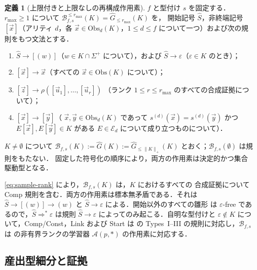 \documentclass[11pt,a4paper]{ltjsarticle}
\numberwithin{equation}{section}
\theoremstyle{plain}
\theoremstyle{definition}
\newtheorem{definition}[theorem]{定義}
\theoremstyle{remark}
\newcommand{\tuple}[1]{\vec{#1}}
\newcommand{\eps}{\varepsilon}
\theoremstyle{plain}
\begin{document}
\begin{definition}[上限付きと上限なしの再構成作用素]
\label{def:reconstruction}
$f$ と型付け $s$ を固定する．$r_{\max}\ge1$ について
$\mathcal B_{f,s}^{\le r_{\max}}(K)=\widehat G_{\le r_{\max}}(K)$ を，
開始記号 $\widehat S$，非終端記号 $[\tuple x]$（アリティ
$d$，各 $\tuple x\in\mathrm{Obs}_d(K)$，$1\le d\le f$ について一つ）および次の規則をもつ文法とする．
\begin{enumerate}[leftmargin=*]
\item[\textnormal{(Start)}] $\widehat S\to[(w)]$（$w\in K\cap\Sigma^+$ について），および
      $\widehat S\to\eps$（$\eps\in K$ のとき）；
\item[\textnormal{(Const)}] $[\tuple x]\to\tuple x$（すべての
      $\tuple x\in\mathrm{Obs}(K)$ について）；
\item[\textnormal{(Comp)}] $[\tuple z]\to\rho([\tuple u_1],\ldots,[\tuple u_r])$
      （ランク $1\le r\le r_{\max}$ のすべての合成証拠について）；
\item[\textnormal{(Link)}] $[\tuple x]\to[\tuple y]$（
      $\tuple x,\tuple y\in\mathrm{Obs}_d(K)$ であって
      $s^{(d)}(\tuple x)=s^{(d)}(\tuple y)$ かつ $E[\tuple x],E[\tuple y]\in K$
      がある $E\in\mathcal E_d$ について成り立つものについて）．
\end{enumerate}
$K\ne\emptyset$ について $\mathcal B_{f,s}(K):=\widehat G(K):=
\widehat G_{\le\|K\|_+}(K)$ とおく；$\mathcal B_{f,s}(\emptyset)$ は規則をもたない．
固定した符号化の順序により，両方の作用素は決定的かつ集合駆動型となる．
\end{definition}

\eqref{eq:sample-rank} により，$\mathcal B_{f,s}(K)$ は，$K$ におけるすべての
合成証拠について Comp 規則を含む．両方の作用素は標本無矛盾である．それは
$\widehat S\to[(w)]\to(w)$ と $\widehat S\to\eps$ による．開始以外のすべての雛形
は $\eps$-free であるので，$\widehat S\Rightarrow^*\eps$ は規則
$\widehat S\to\eps$ によってのみ起こる．自明な型付けと $\eps\notin K$ について，Comp/Const，Link
および Start は
\cite[Section~4.1]{Yoshinaka2011} の Types~I--III の規則に対応し，$\mathcal B_{f,s}$ は
\cite[Corollary~2]{Yoshinaka2011} の非有界ランクの学習器
$\mathcal A(p,*)$ の作用素に対応する．

\subsection{産出型細分と証拠}
\label{sec:refinement}
\end{document}
